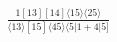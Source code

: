 \documentclass[varwidth, border=5pt]{standalone}
\begin{document}
\begin{my}
$\begin{gathered}
\scriptscriptstyle\frac{1[13][14]⟨15⟩⟨25⟩}{⟨13⟩[15]⟨45⟩⟨5|1+4|5]}
\end{gathered}$
\end{my}
\end{document}
